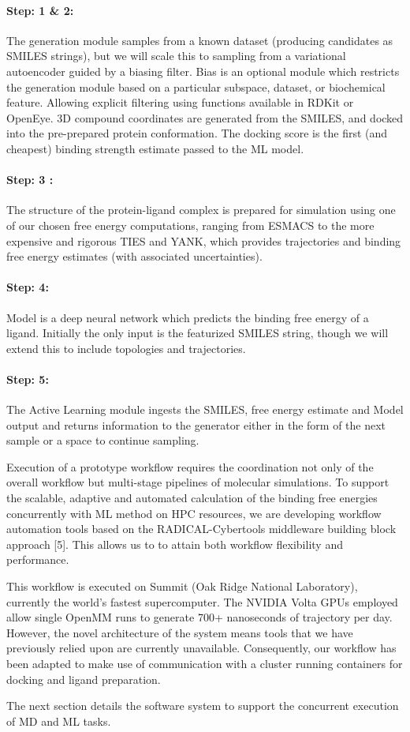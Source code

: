 \paragraph{Step: 1 \& 2:} The generation module samples from a known dataset (producing candidates as SMILES strings), but we will scale this to sampling from a variational autoencoder guided by a biasing filter. Bias is an optional module which restricts the generation module based on a particular subspace, dataset, or biochemical feature. Allowing explicit filtering using functions available in RDKit or OpenEye.  3D compound coordinates are generated from the SMILES, and docked into the pre-prepared protein conformation. The docking score is the first (and cheapest) binding strength estimate passed to the ML model. 

\paragraph{Step: 3 :} The structure of the protein-ligand complex is prepared for simulation using one of our chosen free energy computations, ranging from ESMACS to the more expensive and rigorous TIES and YANK, which provides trajectories and binding free energy estimates (with associated uncertainties). 

\paragraph{Step: 4:} Model is a deep neural network which predicts the binding free energy of a ligand. Initially the only input is the featurized SMILES string, though we will extend this to include topologies and  trajectories. 

\paragraph{Step: 5:}  The Active Learning module ingests the SMILES, free energy estimate and Model output and returns information to the generator either in the form of the next sample or a space to continue sampling. 

Execution of a prototype workflow requires the coordination not only of the overall workflow but multi-stage pipelines of molecular simulations. To support the scalable, adaptive and automated calculation of the binding free energies concurrently with ML method on HPC resources, we are developing workflow automation tools based on the RADICAL-Cybertools middleware building block approach [5]. This allows us to to attain both workflow flexibility and performance.

This workflow is executed on Summit (Oak Ridge National Laboratory), currently
the world’s fastest supercomputer. The NVIDIA Volta GPUs employed allow single
OpenMM runs to generate 700+ nanoseconds of trajectory per day. However, the
novel architecture of the system means tools that we have previously relied
upon are currently unavailable. Consequently, our workflow has been adapted to
make use of communication with a cluster running containers for docking and
ligand preparation.

The next section details the software system to support the concurrent
execution of  MD and ML tasks.

